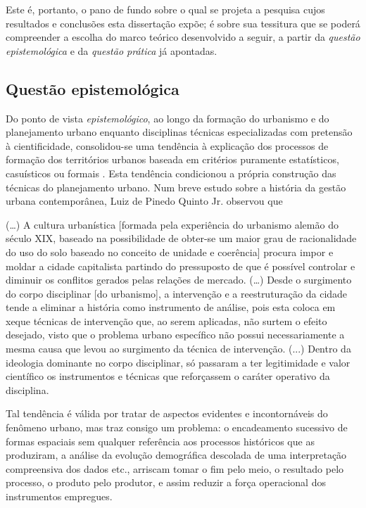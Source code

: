Este é, portanto, o pano de fundo sobre o qual se projeta a pesquisa cujos resultados e conclusões esta dissertação expõe; é sobre sua tessitura que se poderá compreender a escolha do marco teórico desenvolvido a seguir, a partir da \textit{questão epistemológica} e da \textit{questão prática} já apontadas.

\subsection{Questão epistemológica}
\label{subsec:questepist}

Do ponto de vista \textit{epistemológico}, ao longo da formação do urbanismo e do planejamento urbano enquanto disciplinas técnicas especializadas com pretensão à cientificidade, consolidou-se uma tendência à explicação dos processos de formação dos territórios urbanos baseada em critérios puramente estatísticos, casuísticos ou formais \cite{benevolo_historia_1983, mumford_cidade_1998, hall_cidades_2007}. Esta tendência condicionou a própria construção das técnicas do planejamento urbano. Num breve estudo sobre a história da gestão urbana contemporânea, Luiz de Pinedo Quinto Jr. observou que 

\begin{citacao}
(…) A cultura urbanística [formada pela experiência do urbanismo alemão do século XIX, baseado na possibilidade de obter-se um maior grau de racionalidade do uso do solo baseado no conceito de unidade e coerência] procura impor e moldar a cidade capitalista partindo do pressuposto de que é possível controlar e diminuir os conflitos gerados pelas relações de mercado. (…) Desde o surgimento do corpo disciplinar [do urbanismo], a intervenção e a reestruturação da cidade tende a eliminar a história como instrumento de análise, pois esta coloca em xeque técnicas de intervenção que, ao serem aplicadas, não surtem o efeito desejado, visto que o problema urbano específico não possui necessariamente a mesma causa que levou ao surgimento da técnica de intervenção. (...) Dentro da ideologia dominante no corpo disciplinar, só passaram a ter legitimidade e valor científico os instrumentos e técnicas que reforçassem o caráter operativo da disciplina. \cite{QUINTOJR1990}
\end{citacao}

Tal tendência é válida por tratar de aspectos evidentes e incontornáveis do fenômeno urbano, mas traz consigo um problema: o encadeamento sucessivo de formas espaciais sem qualquer referência aos processos históricos que as produziram, a análise da evolução demográfica descolada de uma interpretação compreensiva dos dados etc., arriscam tomar o fim pelo meio, o resultado pelo processo, o produto pelo produtor, e assim reduzir a força operacional dos instrumentos empregues.

